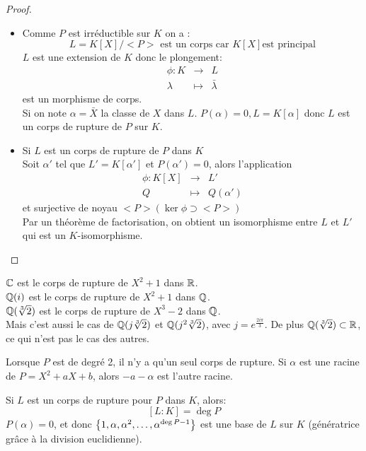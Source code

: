 \begin{proof}

	\begin{itemize}
		\item Comme $P$ est irréductible sur $K$ on a :
		      $$ L = K[X]/<P> \text{ est un corps car } K[X] \text{est principal}$$
		      $L$ est une extension de $K$ donc le plongement:
		      \begin{eqnarray*}
			      \phi: K &\to& L\\
			      \lambda   &\mapsto &\bar{\lambda}
		      \end{eqnarray*}
		      est un morphisme de corps.\\
		      Si on note $\alpha = \bar{X}$ la classe de $X$ dans $L$. $P(\alpha) = 0, L = K[\alpha]$
		      donc $L$ est un corps de rupture de $P$ sur $K$.
		\item Si $L$ est un corps de rupture de $P$ dans $K$ \\
		      Soit $\alpha'$ tel que $L' = K[\alpha']$ et $P(\alpha') = 0$, alors l'application
		      \begin{eqnarray*}
			      \phi : K[X] &\to& L'\\
			      Q &   \mapsto & Q(\alpha')
		      \end{eqnarray*}
		      et surjective de noyau $<P> (\ker \phi \supset <P>)$\\
		      Par un théorème de factorisation, on obtient un isomorphisme entre $L$ et $L'$ qui est un $K$-isomorphisme.
	\end{itemize}
\end{proof}

\begin{example}
	$\mathbb{C}$ est le corps de rupture de $X^2+1$ dans $\mathbb{R}$.\\
	$\mathbb{Q}(i)$ est le corps de rupture de $X^2+1$ dans $\mathbb{Q}$.\\
	$\mathbb{Q}(\sqrt[3]{2})$ est le corps de rupture de $X^3-2$ dans $\mathbb{Q}$.\\
	Mais c'est aussi le cas de $\mathbb{Q}(j\sqrt[3]{2})$ et $\mathbb{Q}(j^2\sqrt[3]{2})$, avec $j = e^{\frac{2i\pi}{3}}$.
	De plus $\mathbb{Q}(\sqrt[3]{2}) \subset \mathbb{R}$, ce qui n'est pas le cas des autres.

	Lorsque $P$ est de degré 2, il n'y a qu'un seul corps de rupture. Si $\alpha$ est une racine de $P = X^2 + aX + b$,
	alors $-a-\alpha$ est l'autre racine.
\end{example}

\begin{remarque}[Important]
	Si $L$ est un corps de rupture pour $P$ dans $K$, alors:
	$$ [L : K] = \deg P$$
	$P(\alpha) = 0$, et donc $\left\{1, \alpha, \alpha^2, \ldots, \alpha^{\deg P -1}\right\}$ est une base de $L$ sur $K$ (génératrice grâce à la division euclidienne).
\end{remarque}


